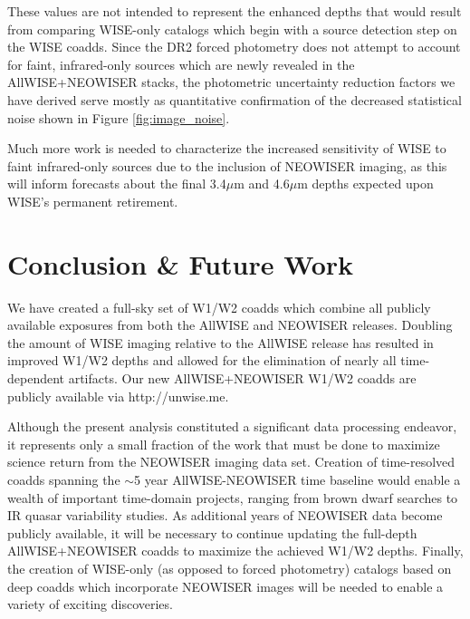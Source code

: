 \documentclass{emulateapj}
\begin{document}
These values are not intended to represent the enhanced
depths that would result from comparing WISE-only catalogs which begin with
a source detection step on the WISE coadds. Since the DR2 forced photometry 
does not attempt to account for faint, infrared-only sources which are
newly revealed in the AllWISE+NEOWISER stacks, the photometric uncertainty
reduction factors we have derived serve mostly as quantitative confirmation 
of the decreased statistical noise shown in Figure \ref{fig:image_noise}.

Much more work is needed to characterize the increased sensitivity
of WISE to faint infrared-only sources due to the inclusion of NEOWISER
imaging, as this will inform forecasts about the final 3.4$\mu$m and 
4.6$\mu$m depths expected upon WISE's permanent retirement.

\section{Conclusion \& Future Work}
\label{sec:future}

We have created a full-sky set of W1/W2 coadds which combine all publicly
available exposures from both the AllWISE and NEOWISER releases. Doubling the 
amount of WISE imaging relative to the AllWISE release has resulted in improved
W1/W2 depths and allowed for the elimination of nearly all time-dependent 
artifacts. Our new AllWISE+NEOWISER W1/W2 coadds are publicly available
via http://unwise.me.


Although the present analysis constituted a significant data processing 
endeavor, it represents only a small fraction of the work that must
be done to maximize science return from the NEOWISER imaging data set.
Creation of time-resolved coadds spanning the $\sim$5 year AllWISE-NEOWISER
time baseline would enable a wealth of important time-domain projects,
ranging from brown dwarf searches to IR quasar variability studies. As
additional years of NEOWISER data become publicly available, it will be 
necessary to continue updating the full-depth AllWISE+NEOWISER coadds to 
maximize the achieved W1/W2 depths. Finally, the creation of WISE-only (as 
opposed to forced photometry) catalogs based on deep coadds which incorporate
NEOWISER images will be needed to enable a variety of exciting discoveries.
\end{document}
